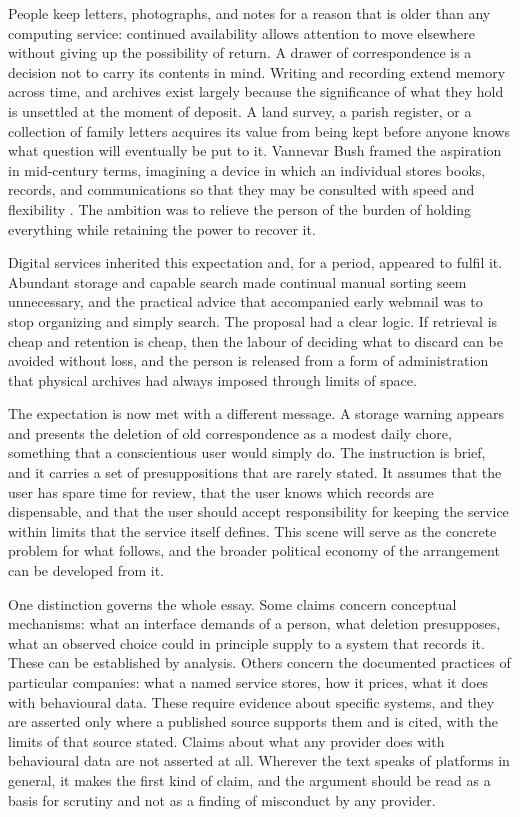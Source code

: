 \documentclass[12pt]{article}
\begin{document}
People keep letters, photographs, and notes for a reason that is older than any computing service: continued availability allows attention to move elsewhere without giving up the possibility of return. A drawer of correspondence is a decision not to carry its contents in mind. Writing and recording extend memory across time, and archives exist largely because the significance of what they hold is unsettled at the moment of deposit. A land survey, a parish register, or a collection of family letters acquires its value from being kept before anyone knows what question will eventually be put to it. Vannevar Bush framed the aspiration in mid-century terms, imagining a device in which an individual stores books, records, and communications so that they may be consulted with speed and flexibility \cite{bush1945}. The ambition was to relieve the person of the burden of holding everything while retaining the power to recover it.

Digital services inherited this expectation and, for a period, appeared to fulfil it. Abundant storage and capable search made continual manual sorting seem unnecessary, and the practical advice that accompanied early webmail was to stop organizing and simply search. The proposal had a clear logic. If retrieval is cheap and retention is cheap, then the labour of deciding what to discard can be avoided without loss, and the person is released from a form of administration that physical archives had always imposed through limits of space.

The expectation is now met with a different message. A storage warning appears and presents the deletion of old correspondence as a modest daily chore, something that a conscientious user would simply do. The instruction is brief, and it carries a set of presuppositions that are rarely stated. It assumes that the user has spare time for review, that the user knows which records are dispensable, and that the user should accept responsibility for keeping the service within limits that the service itself defines. This scene will serve as the concrete problem for what follows, and the broader political economy of the arrangement can be developed from it.

One distinction governs the whole essay. Some claims concern conceptual mechanisms: what an interface demands of a person, what deletion presupposes, what an observed choice could in principle supply to a system that records it. These can be established by analysis. Others concern the documented practices of particular companies: what a named service stores, how it prices, what it does with behavioural data. These require evidence about specific systems, and they are asserted only where a published source supports them and is cited, with the limits of that source stated. Claims about what any provider does with behavioural data are not asserted at all. Wherever the text speaks of platforms in general, it makes the first kind of claim, and the argument should be read as a basis for scrutiny and not as a finding of misconduct by any provider.
\end{document}
